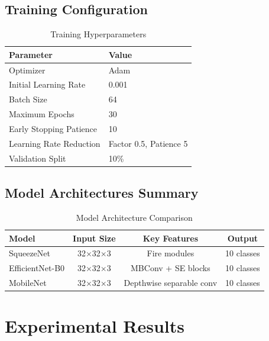 \documentclass[12pt,a4paper]{article}
\begin{document}
\subsection{Training Configuration}

\begin{table}[H]
\centering
\caption{Training Hyperparameters}
\begin{tabular}{ll}
\toprule
\textbf{Parameter} & \textbf{Value} \\
\midrule
Optimizer & Adam \\
Initial Learning Rate & 0.001 \\
Batch Size & 64 \\
Maximum Epochs & 30 \\
Early Stopping Patience & 10 \\
Learning Rate Reduction & Factor 0.5, Patience 5 \\
Validation Split & 10\% \\
\bottomrule
\end{tabular}
\label{tab:hyperparams}
\end{table}

\subsection{Model Architectures Summary}

\begin{table}[H]
\centering
\caption{Model Architecture Comparison}
\begin{tabular}{lccc}
\toprule
\textbf{Model} & \textbf{Input Size} & \textbf{Key Features} & \textbf{Output} \\
\midrule
SqueezeNet & 32$\times$32$\times$3 & Fire modules & 10 classes \\
EfficientNet-B0 & 32$\times$32$\times$3 & MBConv + SE blocks & 10 classes \\
MobileNet & 32$\times$32$\times$3 & Depthwise separable conv & 10 classes \\
\bottomrule
\end{tabular}
\label{tab:architectures}
\end{table}

\section{Experimental Results}
\end{document}
